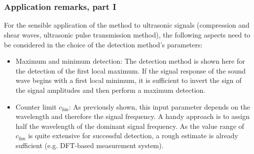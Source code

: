 \documentclass[11pt,aspectratio=169]{beamer}
\begin{document}
	\section{\appendixname}\label{sec:appendix}
	\begin{frame}
		\frametitle{\appendixname{} \textendash{} Application remarks, part I}
		For the sensible application of the method to ultrasonic signals (compression and shear waves, ultrasonic pulse transmission method), the following aspects need to be considered in the choice of the detection method's parameters:
		\begin{itemize}
			\item Maximum and minimum detection: The detection method is shown here for the detection of the first local maximum. If the signal response of the sound wave begins with a first local minimum, it is sufficient to invert the sign of the signal amplitudes and then perform a maximum detection.
			\item Counter limit $c_{\lim}$: As previously shown, this input parameter depends on the wavelength and therefore the signal frequency. A handy approach is to assign half the wavelength of the dominant signal frequency. As the value range of $c_{\lim}$ is quite extensive for successful detection, a rough estimate is already sufficient (e.g. DFT-based measurement system).
		\end{itemize}
	\end{frame}
\end{document}
